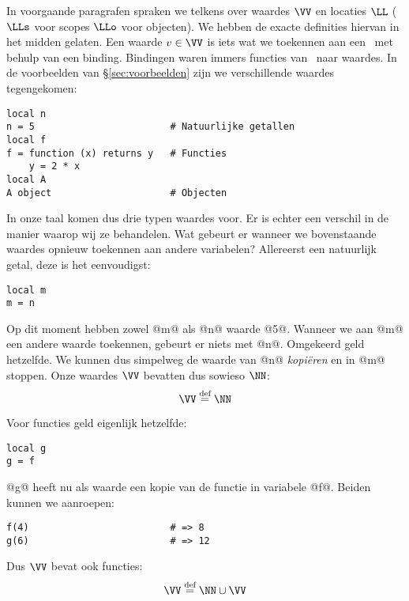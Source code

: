 In voorgaande paragrafen spraken we telkens over waardes $\VV$ en locaties $\LL$ ($\LLs$ voor scopes $\LLo$ voor objecten). We hebben de exacte definities hiervan in het midden gelaten. Een waarde $v\in\VV$ is iets wat we toekennen aan een \Id\ met behulp van een binding. Bindingen waren immers functies van \Id\ naar waardes. In de voorbeelden van §\ref{sec:voorbeelden} zijn we verschillende waardes tegengekomen:
\begin{lstlisting}
local n
n = 5                        # Natuurlijke getallen
local f
f = function (x) returns y   # Functies
    y = 2 * x
local A
A object                     # Objecten
\end{lstlisting}
In onze taal komen dus drie typen waardes voor. Er is echter een verschil in de manier waarop wij ze behandelen. Wat gebeurt er wanneer we bovenstaande waardes opnieuw toekennen aan andere variabelen? Allereerst een natuurlijk getal, deze is het eenvoudigst:
\begin{lstlisting}
local m
m = n
\end{lstlisting}
Op dit moment hebben zowel @m@ als @n@ waarde @5@. Wanneer we aan @m@ een andere waarde toekennen, gebeurt er niets met @n@. Omgekeerd geld hetzelfde. We kunnen dus simpelweg de waarde van @n@ \emph{kopiëren} en in @m@ stoppen. Onze waardes $\VV$ bevatten dus sowieso $\NN$:
\begin{equation*}
  \VV \DEF \NN
\end{equation*}

Voor functies geld eigenlijk hetzelfde:
\begin{lstlisting}
local g
g = f
\end{lstlisting}
@g@ heeft nu als waarde een kopie van de functie in variabele @f@. Beiden kunnen we aanroepen:
\begin{lstlisting}
f(4)                         # => 8
g(6)                         # => 12
\end{lstlisting}
Dus $\VV$ bevat ook functies:
\begin{equation*}
  \VV \DEF \NN \cup \VV
\end{equation*}

